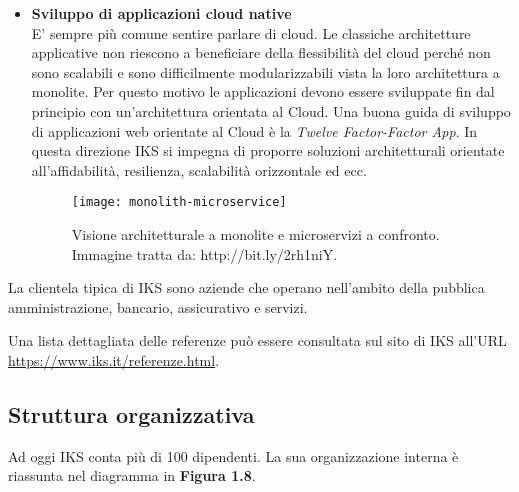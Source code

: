 \begin{itemize}
\begin{itemize}
	
		\item \textbf{Sviluppo di applicazioni cloud native}\\
		E' sempre più comune sentire parlare di cloud. Le classiche architetture applicative 
		non riescono a beneficiare della flessibilità del cloud perché non sono scalabili e sono 
		difficilmente modularizzabili vista la loro architettura a monolite. Per questo motivo
		le applicazioni devono essere sviluppate fin dal principio con un'architettura orientata 
		al Cloud. Una buona guida di sviluppo di applicazioni web orientate al Cloud è la 
		\textit{Twelve Factor-Factor App}. In questa direzione IKS si impegna di proporre 
		soluzioni architetturali orientate all'affidabilità, resilienza, scalabilità orizzontale ed ecc.
		
		\begin{figure}[htbp]
			\begin{center}
				\texttt{[image: monolith-microservice]}
				\caption{Visione architetturale a monolite e microservizi a confronto. Immagine tratta da: http://bit.ly/2rh1niY.}
			\end{center}
		\end{figure}
	\end{itemize} 
\end{itemize}

La clientela tipica di IKS sono aziende che operano nell'ambito 
della pubblica amministrazione, bancario, assicurativo e servizi. 

Una lista dettagliata delle referenze può essere consultata sul sito
di IKS all'URL \url{https://www.iks.it/referenze.html}.


\subsection{Struttura organizzativa}

Ad oggi IKS conta più di 100 dipendenti. La sua organizzazione interna è 
riassunta nel diagramma in \textbf{Figura 1.8}.

